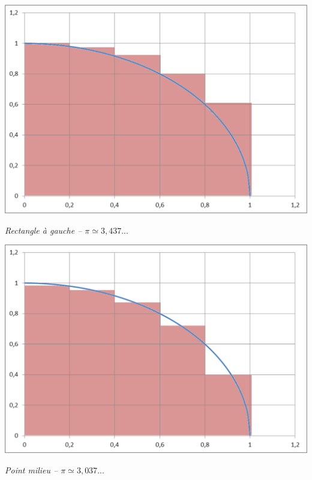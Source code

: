 \documentclass[11pt]{article}
\begin{document}
\begin{minipage}[c]{.32\linewidth}
\begin{center}
\includegraphics[width=.99\textwidth]{images/pi_5_g}

\textit{Rectangle à gauche -- $\pi \simeq 3,437...$  }
\end{center}
\end{minipage}\hfill
\begin{minipage}[c]{.32\linewidth}
\begin{center}
\includegraphics[width=.99\textwidth]{images/pi_5_m}

\textit{Point milieu -- $\pi \simeq 3,037...$}
\end{center}
\end{minipage}\hfill
\end{document}
